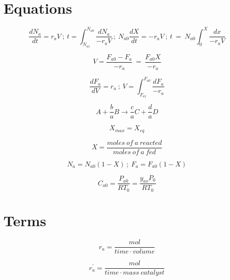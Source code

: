 \documentclass[6pt]{article}
\begin{document}
\twocolumn

\section*{Equations}

\[ \frac{dN_{a}}{dt}=r_{a}V \ ; \ t=\int_{N_{a1}}^{N_{a0}}\frac{dN_{a}}{-r_{a}V} \ ; \ N_{a0}\frac{dX}{dt}=-r_{a}V \ ; \ t\ =\ N_{a0}\int_{0}^{X}\frac{dx}{-r_{a}V} \tag{p25, 25, 39, 40; Des. eq. batch }  \]

\[ V=\frac{F_{a0}-F_{a}}{-r_{a}} \ =\ \frac{F_{a0}X}{-r_{a}} \tag{p43; Des. eq. CSTR} \]

\[ \frac{dF_{a}}{dV}=r_{a} \ ; \  V=\int_{F_{a1}}^{F_{a0}}\frac{dF_{a}}{-r_{a}} \tag{p25, 25 ; Des. eq. PBR change V to W and r to r' for PBR} \]



\[ A+\frac{b}{a}B  \rightarrow  \frac{c}{a}C+\frac{d}{a}D \tag{p38; A is the basis - limiting reactant } \]

\[ X_{max}=X_{eq} \tag{p38} \]

\[ X=\frac{moles\ of\ a\ reacted}{moles\ of\ a\ fed} \tag{p38} \]

\[ N_{a}=N_{a0}\left(1-X\right) \ ; \ F_{a}=F_{a0}\left(1-X\right) \tag{p38, 41} \]


\[ C_{a0}=\frac{P_{a0}}{RT_{0}}=\frac{y_{ao}P_{0}}{RT_{0}} \tag{p41; concentration of ideal gas} \]








\clearpage
\section*{Terms}

\[ r_{a} =  \frac{mol}{time \cdot volume}  \label{rate} \tag{p6} \]




\[ r_{a}^{'}=\frac{mol}{time\cdot mass\ catalyst} \tag{p6} \]
\end{document}
